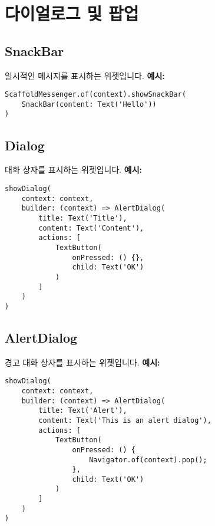 \documentclass{article}
\begin{document}
\section*{다이얼로그 및 팝업}
\subsection*{SnackBar}
일시적인 메시지를 표시하는 위젯입니다.
\textbf{예시:}
\begin{lstlisting}
ScaffoldMessenger.of(context).showSnackBar(
    SnackBar(content: Text('Hello'))
)
\end{lstlisting}

\subsection*{Dialog}
대화 상자를 표시하는 위젯입니다.
\textbf{예시:}
\begin{lstlisting}
showDialog(
    context: context,
    builder: (context) => AlertDialog(
        title: Text('Title'),
        content: Text('Content'),
        actions: [
            TextButton(
                onPressed: () {},
                child: Text('OK')
            )
        ]
    )
)
\end{lstlisting}

\subsection*{AlertDialog}
경고 대화 상자를 표시하는 위젯입니다.
\textbf{예시:}
\begin{lstlisting}
showDialog(
    context: context,
    builder: (context) => AlertDialog(
        title: Text('Alert'),
        content: Text('This is an alert dialog'),
        actions: [
            TextButton(
                onPressed: () {
                    Navigator.of(context).pop();
                },
                child: Text('OK')
            )
        ]
    )
)
\end{lstlisting}
\end{document}
